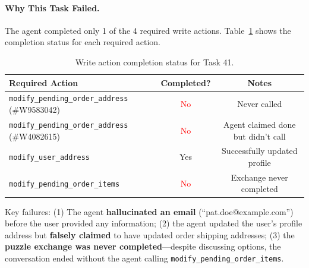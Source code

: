 \paragraph{Why This Task Failed.} The agent completed only 1 of the 4 required write actions. Table~\ref{tab:task41-completion} shows the completion status for each required action.

\begin{table}[h]
\centering
\small
\begin{tabular}{lcc}
\toprule
\textbf{Required Action} & \textbf{Completed?} & \textbf{Notes} \\
\midrule
\texttt{modify\_pending\_order\_address} (\#W9583042) & \textcolor{red}{No} & Never called \\
\texttt{modify\_pending\_order\_address} (\#W4082615) & \textcolor{red}{No} & Agent claimed done but didn't call \\
\texttt{modify\_user\_address} & \textcolor{green!60!black}{Yes} & Successfully updated profile \\
\texttt{modify\_pending\_order\_items} & \textcolor{red}{No} & Exchange never completed \\
\bottomrule
\end{tabular}
\caption{Write action completion status for Task 41.}
\label{tab:task41-completion}
\end{table}

Key failures: (1) The agent \textbf{hallucinated an email} (``pat.doe@example.com'') before the user provided any information; (2) the agent updated the user's profile address but \textbf{falsely claimed} to have updated order shipping addresses; (3) the \textbf{puzzle exchange was never completed}---despite discussing options, the conversation ended without the agent calling \texttt{modify\_pending\_order\_items}.

